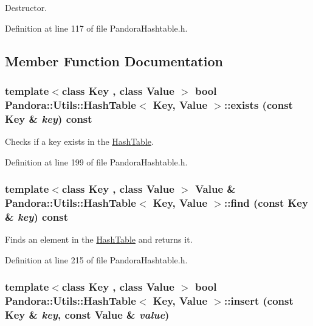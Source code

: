 Destructor. 

Definition at line 117 of file PandoraHashtable.h.

\subsection{Member Function Documentation}
\hypertarget{classPandora_1_1Utils_1_1HashTable_a61bb5ce54f3380c10edebb59cac114cd}{
\subsubsection[{exists}]{\setlength{\rightskip}{0pt plus 5cm}template$<$class Key , class Value $>$ bool {\bf Pandora::Utils::HashTable}$<$ Key, Value $>$::exists (const Key \& {\em key}) const}}
\label{classPandora_1_1Utils_1_1HashTable_a61bb5ce54f3380c10edebb59cac114cd}


Checks if a key exists in the \hyperlink{classPandora_1_1Utils_1_1HashTable}{HashTable}. 

Definition at line 199 of file PandoraHashtable.h.\hypertarget{classPandora_1_1Utils_1_1HashTable_ab1aae3564898a1de7870930f7e678de0}{
\subsubsection[{find}]{\setlength{\rightskip}{0pt plus 5cm}template$<$class Key , class Value $>$ Value \& {\bf Pandora::Utils::HashTable}$<$ Key, Value $>$::find (const Key \& {\em key}) const}}
\label{classPandora_1_1Utils_1_1HashTable_ab1aae3564898a1de7870930f7e678de0}


Finds an element in the \hyperlink{classPandora_1_1Utils_1_1HashTable}{HashTable} and returns it. 

Definition at line 215 of file PandoraHashtable.h.\hypertarget{classPandora_1_1Utils_1_1HashTable_a57a06b0dde67656b86fd91c04e9a4fbf}{
\subsubsection[{insert}]{\setlength{\rightskip}{0pt plus 5cm}template$<$class Key , class Value $>$ bool {\bf Pandora::Utils::HashTable}$<$ Key, Value $>$::insert (const Key \& {\em key}, \/  const Value \& {\em value})}}
\label{classPandora_1_1Utils_1_1HashTable_a57a06b0dde67656b86fd91c04e9a4fbf}


